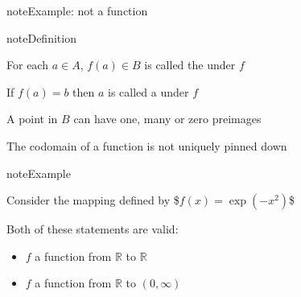 \documentclass[letterpaper,10pt,english]{jupyterBook}
\begin{document}
\begin{figure}[htbp]
\centering

\noindent{}
\end{figure}

\begin{sphinxadmonition}{note}{Example: not a function}

\begin{figure}[H]
\centering

\noindent{}
\end{figure}
\end{sphinxadmonition}

\begin{sphinxadmonition}{note}{Definition}

\sphinxAtStartPar
For each \(a \in A\), \(f(a) \in B\) is called the  under \(f\)
\end{sphinxadmonition}

\begin{figure}[htbp]
\centering

\noindent{}
\end{figure}

\sphinxAtStartPar
If \(f(a) = b\) then \(a\) is called a  under \(f\)

\begin{figure}[htbp]
\centering

\noindent{}
\end{figure}

\sphinxAtStartPar
A point in \(B\) can have one, many or zero preimages

\begin{figure}[htbp]
\centering

\noindent{}
\end{figure}

\sphinxAtStartPar
The codomain of a function is not uniquely pinned down

\begin{sphinxadmonition}{note}{Example}

\sphinxAtStartPar
Consider the mapping defined by
\$\(f(x) = \exp(-x^2)\)\$

\sphinxAtStartPar
Both of these statements are valid:
\begin{itemize}
\item {} 
\sphinxAtStartPar
\(f\) a function from \(\mathbb{R}\) to \(\mathbb{R}\)

\item {} 
\sphinxAtStartPar
\(f\) a function from \(\mathbb{R}\) to \((0, \infty)\)

\end{itemize}
\end{sphinxadmonition}
\end{document}
